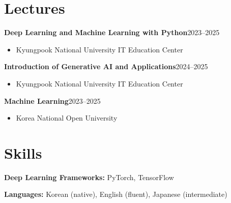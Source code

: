 \documentclass[10pt,a4paper]{article}
\newif\ifRemVS
\newcommand{\rvs}{\ifRemVS\vspace{-1.5ex}\fi\global\RemVSfalse}
\newcommand{\cventry}[3]{%
  \noindent\begin{minipage}{\linewidth}
    \rvs
    {\small\textbf{#1}\hfill #2\par}
    \begin{itemize}[topsep=2pt]\item #3\end{itemize}
  \end{minipage}\par}
\begin{document}
\section{Lec\color{black}tures}
\cventry{Deep Learning and Machine Learning with Python}{2023–2025}{%
  Kyungpook National University IT Education Center}
\cventry{Introduction of Generative AI and Applications}{2024–2025}{%
  Kyungpook National University IT Education Center}
\cventry{Machine Learning}{2023–2025}{Korea National Open University}

\section{Ski\color{black}lls}
\begin{minipage}{\linewidth}
\textbf{Deep Learning Frameworks:} PyTorch, TensorFlow\par
\textbf{Languages:} Korean (native), English (fluent), Japanese (intermediate)
\end{minipage}
\end{document}
